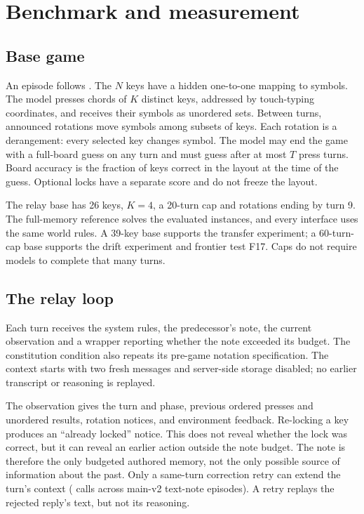 \section{Benchmark and measurement}

\subsection{Base game}
An episode follows \blindboard{} \citep{blindboard2026}. The $N$ keys have a hidden one-to-one mapping to symbols. The model presses chords of $K$ distinct keys, addressed by touch-typing coordinates, and receives their symbols as unordered sets. Between turns, announced rotations move symbols among subsets of keys. Each rotation is a derangement: every selected key changes symbol. The model may end the game with a full-board guess on any turn and must guess after at most $T$ press turns. Board accuracy is the fraction of keys correct in the layout at the time of the guess. Optional locks have a separate score and do not freeze the layout.

The relay base has 26 keys, $K{=}4$, a 20-turn cap and rotations ending by turn 9. The full-memory reference solves the evaluated instances, and every interface uses the same world rules. A 39-key base supports the transfer experiment; a 60-turn-cap base supports the drift experiment and frontier test F17. Caps do not require models to complete that many turns.

\subsection{The relay loop}\label{sec:loop}
Each turn receives the system rules, the predecessor's note, the current observation and a wrapper reporting whether the note exceeded its budget. The constitution condition also repeats its pre-game notation specification. The context starts with two fresh messages and server-side storage disabled; no earlier transcript or reasoning is replayed.

The observation gives the turn and phase, previous ordered presses and unordered results, rotation notices, and environment feedback. Re-locking a key produces an ``already locked'' notice. This does not reveal whether the lock was correct, but it can reveal an earlier action outside the note budget. The note is therefore the only budgeted authored memory, not the only possible source of information about the past. Only a same-turn correction retry can extend the turn's context (\relayretrycalls{} calls across main-v2 text-note episodes). A retry replays the rejected reply's text, but not its reasoning.

